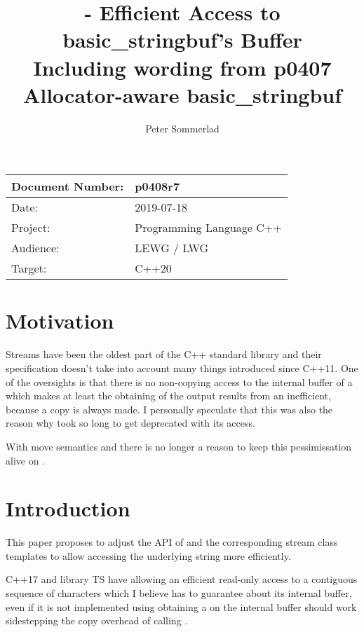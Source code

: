 \documentclass[ebook,11pt,article]{memoir}
\title{\papernumber{} - Efficient Access to basic\_stringbuf's Buffer\\
Including wording from p0407 Allocator-aware basic\_stringbuf}
\author{Peter Sommerlad}
\date{\paperdate}                        %
\newcommand{\papernumber}{p0408r7}
\newcommand{\paperdate}{2019-07-18}
\begin{document}
\maketitle
\begin{tabular}[t]{|l|l|}\hline 
Document Number: & \papernumber  \\\hline
Date: & \paperdate \\\hline
Project: & Programming Language C++\\\hline 
Audience: & LEWG / LWG\\\hline
Target: & C++20\\\hline
\end{tabular}

\chapter{Motivation}
Streams have been the oldest part of the C++ standard library and their specification doesn't take into account many things introduced since C++11. One of  the oversights is that there is no non-copying access to the internal buffer of a  which makes at least the obtaining of the output results from an  inefficient, because a copy is always made. I personally speculate that this was also the reason why  took so long to get deprecated with its  access.

With move semantics and  there is no longer a reason to keep this pessimissation alive on .


\chapter{Introduction}
This paper proposes to adjust the API of  and the corresponding stream class templates to allow accessing the underlying string more efficiently.

C++17 and library TS have  allowing an efficient read-only access to a contiguous sequence of characters which I believe  has to guarantee about its internal buffer, even if it is not implemented using  obtaining a  on the internal buffer should work sidestepping the copy overhead of calling . 
\end{document}
